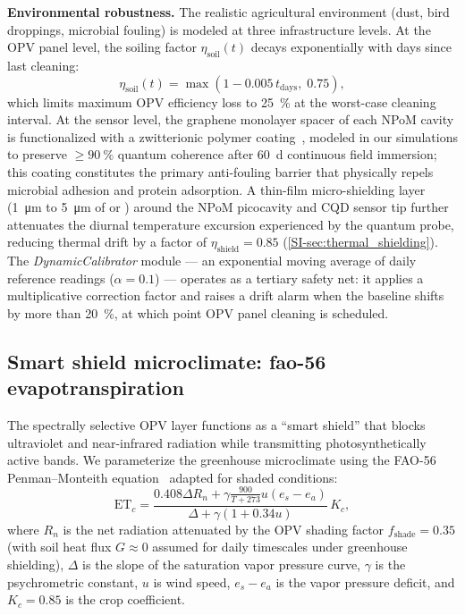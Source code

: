 \documentclass[onecolumn,a4paper,12pt]{article}
\begin{document}
\textbf{Environmental robustness.}
The realistic agricultural environment (dust, bird droppings, microbial fouling) is modeled at three infrastructure levels.
At the OPV panel level, the soiling factor $\eta_{\mathrm{soil}}(t)$ decays exponentially with days since last cleaning:
\begin{equation}
  \eta_{\mathrm{soil}}(t) = \max\!\left(1 - 0.005\,t_{\mathrm{days}},\; 0.75\right),
  \label{eq:soiling}
\end{equation}
which limits maximum OPV efficiency loss to \qty{25}{\percent} at the worst-case cleaning interval.
At the sensor level, the graphene monolayer spacer of each NPoM cavity is functionalized with a zwitterionic polymer coating~\cite{Kumar2022,Do2025}, modeled in our simulations to preserve $\geq\qty{90}{\percent}$ quantum coherence after \qty{60}{\day} continuous field immersion; this coating constitutes the primary anti-fouling barrier that physically repels microbial adhesion and protein adsorption. A thin-film micro-shielding layer (\qty{1}{\micro\meter} to \qty{5}{\micro\meter} of  or ) around the NPoM picocavity and CQD sensor tip further attenuates the diurnal temperature excursion experienced by the quantum probe, reducing thermal drift by a factor of $\eta_{\mathrm{shield}} = 0.85$ (\cref{SI-sec:thermal_shielding}). The \textit{DynamicCalibrator} module --- an exponential moving average of daily reference readings ($\alpha = 0.1$) --- operates as a tertiary safety net: it applies a multiplicative correction factor and raises a drift alarm when the baseline shifts by more than \qty{20}{\percent}, at which point OPV panel cleaning is scheduled.

\subsection*{Smart shield microclimate: fao-56 evapotranspiration}

The spectrally selective OPV layer functions as a ``smart shield'' that blocks ultraviolet and near-infrared radiation while transmitting photosynthetically active bands.
We parameterize the greenhouse microclimate using the FAO-56 Penman--Monteith equation~\cite{Allen1998} adapted for shaded conditions:
\begin{equation}
\mathrm{ET}_c = \frac{0.408 \Delta R_n + \gamma \frac{900}{T+273} u (e_s - e_a)}{\Delta + \gamma(1 + 0.34 u)} \, K_c,
\label{eq:fao56}
\end{equation}
where $R_n$ is the net radiation attenuated by the OPV shading factor $f_{\mathrm{shade}} = 0.35$ (with soil heat flux $G \approx 0$ assumed for daily timescales under greenhouse shielding), $\Delta$ is the slope of the saturation vapor pressure curve, $\gamma$ is the psychrometric constant, $u$ is wind speed, $e_s - e_a$ is the vapor pressure deficit, and $K_c = 0.85$ is the crop coefficient.
\end{document}
